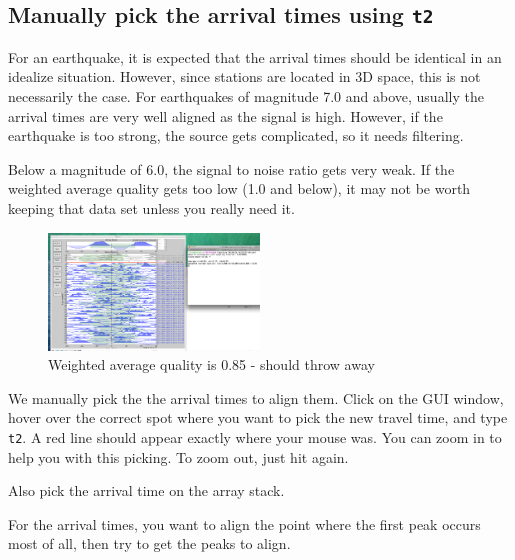 \documentclass[letterpaper,10pt]{article}
\begin{document}

\subsection{Manually pick the arrival times using \texttt{t2}}

For an earthquake, it is expected that the arrival times should be identical in an idealize situation. However, since stations are located in 3D space, this is not necessarily the case. For earthquakes of magnitude 7.0 and above, usually the arrival times are very well aligned as the signal is high. However, if the earthquake is too strong, the source gets complicated, so it needs filtering. 

Below a magnitude of 6.0, the signal to noise ratio gets very weak. If the weighted average quality gets too low (1.0 and below), it may not be worth keeping that data set unless you really need it. 

\begin{figure}[h!]
  \centering
  \includegraphics[width=0.5\textwidth]{images/not_worth_it}
  \caption{Weighted average quality is 0.85 - should throw away}
  \label{fig:not_worth_it}
\end{figure}

We manually pick the the arrival times to align them. Click on the GUI window, hover over the correct spot where you want to pick the new travel time, and type \texttt{t2}. A red line should appear exactly where your mouse was. You can zoom in to help you with this picking. To zoom out, just hit  again.

Also pick the arrival time on the array stack. 

For the arrival times, you want to align the point where the first peak occurs most of all, then try to get the peaks to align. 
\end{document}

